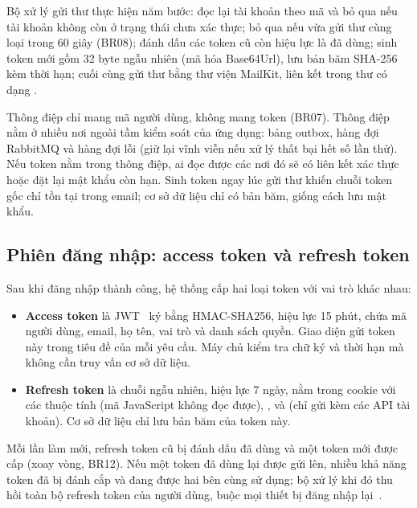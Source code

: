 Bộ xử lý gửi thư thực hiện năm bước: đọc lại tài khoản theo mã và bỏ qua nếu tài khoản không còn ở
trạng thái chưa xác thực; bỏ qua nếu vừa gửi thư cùng loại trong 60 giây (BR08); đánh dấu các token cũ
còn hiệu lực là đã dùng; sinh token mới gồm 32 byte ngẫu nhiên (mã hóa Base64Url), lưu bản băm SHA-256
kèm thời hạn; cuối cùng gửi thư bằng thư viện MailKit, liên kết trong thư có dạng
.

Thông điệp chỉ mang mã người dùng, không mang token (BR07). Thông điệp nằm ở nhiều nơi ngoài tầm
kiểm soát của ứng dụng: bảng outbox, hàng đợi RabbitMQ và hàng đợi lỗi (giữ lại vĩnh viễn nếu xử lý
thất bại hết số lần thử). Nếu token nằm trong thông điệp, ai đọc được các nơi đó sẽ có liên kết xác
thực hoặc đặt lại mật khẩu còn hạn. Sinh token ngay lúc gửi thư khiến chuỗi token gốc chỉ tồn tại trong
email; cơ sở dữ liệu chỉ có bản băm, giống cách lưu mật khẩu.

\subsection{Phiên đăng nhập: access token và refresh token}

Sau khi đăng nhập thành công, hệ thống cấp hai loại token với vai trò khác nhau:

\begin{itemize}
  \item \textbf{Access token} là JWT~\cite{rfc7519} ký bằng HMAC-SHA256, hiệu lực 15 phút, chứa mã người
  dùng, email, họ tên, vai trò và danh sách quyền. Giao diện gửi token này trong tiêu đề
   của mỗi yêu cầu. Máy chủ kiểm tra chữ ký và thời hạn mà không cần truy vấn cơ sở
  dữ liệu.
  \item \textbf{Refresh token} là chuỗi ngẫu nhiên, hiệu lực 7 ngày, nằm trong cookie
   với các thuộc tính  (mã JavaScript không đọc được),
  ,  và  (chỉ gửi kèm các API tài khoản).
  Cơ sở dữ liệu chỉ lưu bản băm của token này.
\end{itemize}

Mỗi lần làm mới, refresh token cũ bị đánh dấu đã dùng và một token mới được cấp (xoay vòng, BR12).
Nếu một token đã dùng lại được gửi lên, nhiều khả năng token đã bị đánh cắp và đang được hai bên cùng
sử dụng; bộ xử lý  khi đó thu hồi toàn bộ refresh token của người
dùng, buộc mọi thiết bị đăng nhập lại~\cite{owasp-session}.

